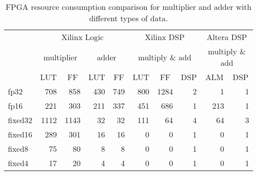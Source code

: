 \begin{table}[htbp]
    \centering
    \caption{FPGA resource consumption comparison for multiplier and adder with different types of data.}
      \begin{tabular}{|l|r|r|r|r|r|r|r|r|r|} \hline
      \multirow{2}[4]{*}{} & \multicolumn{4}{c|}{Xilinx Logic} & \multicolumn{3}{c|}{Xilinx DSP} & \multicolumn{2}{c|}{Altera DSP} \\ \cline{2-10}         
       & \multicolumn{2}{c|}{multiplier} & \multicolumn{2}{c|}{adder} & \multicolumn{3}{c|}{multiply \& add} & \multicolumn{2}{c|}{multiply \& add} \\ \cline{2-10}
            & \multicolumn{1}{c|}{LUT} & \multicolumn{1}{c|}{FF} & \multicolumn{1}{c|}{LUT} & \multicolumn{1}{c|}{FF} & \multicolumn{1}{c|}{LUT} & \multicolumn{1}{c|}{FF} & \multicolumn{1}{c|}{DSP} & \multicolumn{1}{c|}{ALM} & \multicolumn{1}{c|}{DSP} \\ \hline
      fp32  & 708   & 858   & 430   & 749   & 800   & 1284  & 2     & 1     & 1 \\ \hline
      fp16  & 221   & 303   & 211   & 337   & 451   & 686   & 1     & 213   & 1 \\ \hline
      fixed32 & 1112  & 1143  & 32    & 32    & 111   & 64    & 4     & 64    & 3 \\ \hline
      fixed16 & 289   & 301   & 16    & 16    & 0     & 0     & 1     & 0     & 1 \\ \hline
      fixed8 & 75    & 80    & 8     & 8     & 0     & 0     & 1     & 0     & 1 \\ \hline
      fixed4 & 17    & 20    & 4     & 4     & 0     & 0     & 1     & 0     & 1 \\ \hline
      \end{tabular}
    \label{tab:mac}
  \end{table}
  